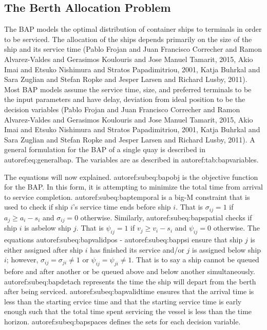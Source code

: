 \documentclass[11pt,a4paper,final]{article}
\begin{document}
\subsection{The Berth Allocation Problem}
\label{sec:orgcf54e50}
The BAP models the optimal distribution of container ships to terminals in order to be serviced. The allocation of the
ships depends primarily on the size of the ship and its service time
(Pablo Frojan and Juan Francisco Correcher and Ramon Alvarez-Valdes and Gerasimos Koulouris and Jose Manuel Tamarit, 2015, Akio Imai and Etsuko Nishimura and Stratos Papadimitriou, 2001, Katja Buhrkal and Sara Zuglian and Stefan Ropke and Jesper Larsen and Richard Lusby, 2011). Most BAP models assume the service
time, size, and preferred terminals to be the input parameters and have delay, deviation from ideal position to be the decision
variables (Pablo Frojan and Juan Francisco Correcher and Ramon Alvarez-Valdes and Gerasimos Koulouris and Jose Manuel Tamarit, 2015, Akio Imai and Etsuko Nishimura and Stratos Papadimitriou, 2001, Katja Buhrkal and Sara Zuglian and Stefan Ropke and Jesper Larsen and Richard Lusby, 2011). A general formulation for the
BAP of a single quay is described in autoref:eq:generalbap. The variables are as described in autoref:tab:bapvariables.

The equations will now explained. autoref:subeq:bapobj is the objective function for the BAP. In this form, it is
attempting to minimize the total time from arrival to service completion. autoref:subeq:baptemporal is a big-M
constraint that is used to check if ship \(i\)'s service time ends before ship \(i\). That is \(\sigma_{ij}=1\) if \(a_j \ge a_i -
s_i\) and \(\sigma_{ij} = 0\) otherwise. Similarly, autoref:subeq:bapspatial checks if ship \(i\) is asbelow ship \(j\). That is
\(\psi_{ij} = 1\) if \(v_j \ge v_i - s_i\) and \(\psi_{ij} = 0\) otherwise. The equations autoref:subeq:bapvalidpos -
autoref:subeq:bappsi ensure that ship \(j\) is either assigned after ship \(i\) has finished its service and/or \(j\) is
assigned below ship \(i\); however, \(\sigma_{ij} = \sigma_{ji} \ne 1\) or \(\psi_{ij} = \psi_{ji} \ne 1\). That is to say a ship cannot be queued
before and after another or be queued above and below another simultaneously. autoref:subeq:bapdetach represents the time the ship will depart
from the berth after being serviced. autoref:subeq:bapvalidtime ensures that the arrival time is less than the starting ervice time and that the
starting service time is early enough such that the total time spent servicing the vessel is less than the time horizon. autoref:subeq:bapspaces
defines the sets for each decision variable.
\end{document}
